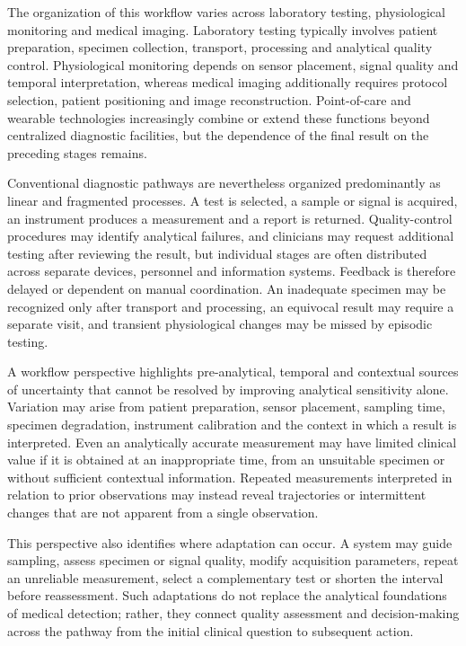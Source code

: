 \documentclass[12pt,a4paper]{article}
\begin{document}
The organization of this workflow varies across laboratory testing, physiological monitoring and medical imaging. Laboratory testing typically involves patient preparation, specimen collection, transport, processing and analytical quality control. Physiological monitoring depends on sensor placement, signal quality and temporal interpretation, whereas medical imaging additionally requires protocol selection, patient positioning and image reconstruction. Point-of-care and wearable technologies increasingly combine or extend these functions beyond centralized diagnostic facilities, but the dependence of the final result on the preceding stages remains.

Conventional diagnostic pathways are nevertheless organized predominantly as linear and fragmented processes. A test is selected, a sample or signal is acquired, an instrument produces a measurement and a report is returned. Quality-control procedures may identify analytical failures, and clinicians may request additional testing after reviewing the result, but individual stages are often distributed across separate devices, personnel and information systems. Feedback is therefore delayed or dependent on manual coordination. An inadequate specimen may be recognized only after transport and processing, an equivocal result may require a separate visit, and transient physiological changes may be missed by episodic testing.

A workflow perspective highlights pre-analytical, temporal and contextual sources of uncertainty that cannot be resolved by improving analytical sensitivity alone. Variation may arise from patient preparation, sensor placement, sampling time, specimen degradation, instrument calibration and the context in which a result is interpreted. Even an analytically accurate measurement may have limited clinical value if it is obtained at an inappropriate time, from an unsuitable specimen or without sufficient contextual information. Repeated measurements interpreted in relation to prior observations may instead reveal trajectories or intermittent changes that are not apparent from a single observation.

This perspective also identifies where adaptation can occur. A system may guide sampling, assess specimen or signal quality, modify acquisition parameters, repeat an unreliable measurement, select a complementary test or shorten the interval before reassessment. Such adaptations do not replace the analytical foundations of medical detection; rather, they connect quality assessment and decision-making across the pathway from the initial clinical question to subsequent action.
\end{document}
